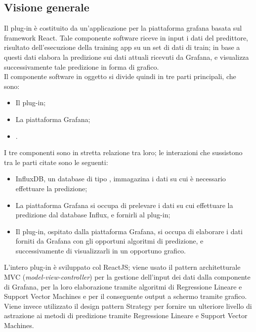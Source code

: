 \documentclass[../manuale-sviluppatore.tex]{subfiles}
\begin{document}
\subsection{Visione generale}
Il plug-in è costituito da un'applicazione per la piattaforma grafana basata sul framework React. Tale componente software riceve in input i dati del predittore, risultato dell'esecuzione della training app su un set di dati di train; in base a questi dati elabora la predizione sui dati attuali ricevuti da Grafana, e visualizza successivamente tale predizione in forma di grafico. \\
Il componente software in oggetto si divide quindi in tre parti principali, che sono:
\begin{itemize}
  \item Il plug-in;
  \item La piattaforma Grafana;
  \item {}.
\end{itemize}

I tre componenti sono in stretta relazione tra loro; le interazioni che sussistono tra le parti citate sono le seguenti:
\begin{itemize}
  \item InfluxDB, un database di tipo , immagazina i dati su cui è necessario effettuare la predizione;
  \item La piattaforma Grafana si occupa di prelevare i dati su cui effettuare la predizione dal database Influx, e fornirli al plug-in;
  \item Il plug-in, ospitato dalla piattaforma Grafana, si occupa di elaborare i dati forniti da Grafana con gli opportuni algoritmi di predizione, e successivamente di visualizzarli in un opportuno grafico.
\end{itemize}

L'intero plug-in è sviluppato col  ReactJS; viene usato il pattern architetturale MVC (\textit{model-view-controller}) per la gestione dell'input dei dati dalla componente  di Grafana, per la loro elaborazione tramite algoritmi di Regressione Lineare e Support Vector Machines e per il conseguente output a schermo tramite grafico. \\
Viene invece utilizzato il design pattern Strategy per fornire un ulteriore livello di astrazione ai metodi di predizione tramite Regressione Lineare e Support Vector Machines.
\end{document}
